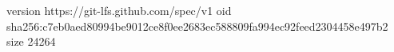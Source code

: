 version https://git-lfs.github.com/spec/v1
oid sha256:c7eb0aed80994be9012ce8f0ee2683ec588809fa994ec92feed2304458e497b2
size 24264

